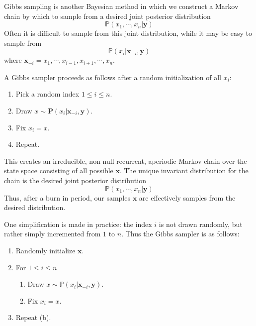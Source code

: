 
Gibbs sampling is another Bayesian method in which we construct a Markov chain by which to sample from a desired joint posterior distribution 
\begin{equation*}
\mathbb{P}(x_{1},\cdots,x_{n} | \mathbf{y})
\end{equation*}
Often it is difficult to sample from this joint distribution, while it may be easy to sample from 
\begin{equation*}
\mathbb{P}(x_{i} | \mathbf{x}_{-i}, \mathbf{y})
\end{equation*}
where $\mathbf{x}_{-i} = x_{1},\cdots,x_{i-1},x_{i+1},\cdots,x_{n}.$

A Gibbs sampler proceeds as follows after a random initialization of all $x_{i}$:
\begin{enumerate}
	\item Pick a random index $1 \leq i \leq n$.
	\item Draw $x \sim \mathbf{P}(x_{i} | \mathbf{x}_{-i}, \mathbf{y})$.
	\item Fix $x_{i} = x$.
	\item Repeat.
\end{enumerate}

This creates an irreducible, non-null recurrent, aperiodic Markov chain over the state space consisting of all possible $\mathbf{x}$. The unique invariant distribution for the chain is the desired joint posterior distribution 
\begin{equation*}
\mathbb{P}(x_{1},\cdots,x_{n} | \mathbf{y})
\end{equation*}
Thus, after a burn in period, our samples $\mathbf{x}$ are effectively samples from the desired distribution.

One simplification is made in practice: the index $i$ is not drawn randomly, but rather simply incremented from $1$ to $n$. Thus the Gibbs sampler is as follows:
\begin{enumerate}
	\item Randomly initialize $\mathbf{x}$.
	\item For $1 \leq i \leq n$
	\begin{enumerate}
		\item Draw $x \sim \mathbb{P}(x_{i} | \mathbf{x}_{-i}, \mathbf{y})$.
		\item Fix $x_{i} = x$.
	\end{enumerate}
	\item Repeat (b).
\end{enumerate}

